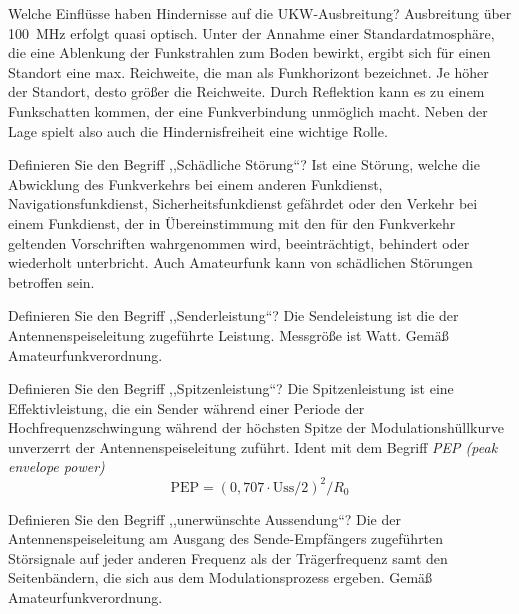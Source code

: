 \documentclass[avery5371,grid,frame,a4paper]{flashcards}
\newcommand{\card}[3]{
  \begin{flashcard}[{\chap} -- #1]{#2}#3\end{flashcard}
}
\begin{document}
\card{52}{Welche Einflüsse haben Hindernisse auf die UKW-Ausbreitung?}{
  Ausbreitung über 100~MHz erfolgt quasi optisch. Unter der Annahme einer Standardatmosphäre, die eine Ablenkung der Funkstrahlen zum Boden bewirkt, ergibt sich für einen Standort eine max. Reichweite, die man als Funkhorizont bezeichnet. Je höher der Standort, desto größer die Reichweite. Durch Reflektion kann es zu einem Funkschatten kommen, der eine Funkverbindung unmöglich macht. Neben der Lage spielt also auch die Hindernisfreiheit eine wichtige Rolle.
}
\card{53}{Definieren Sie den Begriff ,,Schädliche Störung``?}{
  Ist eine Störung, welche die Abwicklung des Funkverkehrs bei einem anderen Funkdienst, Navigationsfunkdienst, Sicherheitsfunkdienst gefährdet oder den Verkehr bei einem Funkdienst, der in Übereinstimmung mit den für den Funkverkehr geltenden Vorschriften wahrgenommen wird, beeinträchtigt, behindert oder wiederholt unterbricht. Auch Amateurfunk kann von schädlichen Störungen betroffen sein.
}
\card{54}{Definieren Sie den Begriff ,,Senderleistung``?}{
  Die Sendeleistung ist die der Antennenspeiseleitung zugeführte Leistung. Messgröße ist Watt. Gemäß Amateurfunkverordnung.
}
\card{55}{Definieren Sie den Begriff ,,Spitzenleistung``?}{
  Die Spitzenleistung ist eine Effektivleistung, die ein Sender während einer Periode der Hochfrequenzschwingung während der höchsten Spitze der Modulationshüllkurve unverzerrt der Antennenspeiseleitung zuführt. Ident mit dem Begriff \emph{PEP (peak envelope power)}
  \[ \text{PEP} = (0,707 \cdot \text{Uss}/2)^2 / R_0 \]
}
\card{56}{Definieren Sie den Begriff ,,unerwünschte Aussendung``?}{
  Die der Antennenspeiseleitung am Ausgang des Sende-Empfängers zugeführten Störsignale auf jeder anderen Frequenz als der Trägerfrequenz samt den Seitenbändern, die sich aus dem Modulationsprozess ergeben. Gemäß Amateurfunkverordnung.
}
\end{document}
